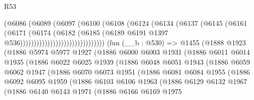 \begin{lexlean}{R53}
\begin{coremodule}
                                    (@6086
                                      (@6089
                                        (@6097
                                          (@6100
                                            (@6108
                                              (@6124
                                                (@6134
                                                  (@6137
                                                    (@6145
                                                      (@6161
                                                        (@6171
                                                          (@6174
                                                            (@6182
                                                              (@6185
                                                                (@6189
                                                                  @6191
                                                                  @1397
                                                                  @536)))))))))))))))))))))))))))))))
    (fun (__b : @530) =>
    @1455
      (@1888
        @1923
        (@1886
          @5974
          @5977
          @1927
          (@1886
            @6000
            @6003
            @1931
            (@1886
              @6011
              @6014
              @1935
              (@1886
                @6022
                @6025
                @1939
                (@1886
                  @6048
                  @6051
                  @1943
                  (@1886
                    @6059
                    @6062
                    @1947
                    (@1886
                      @6070
                      @6073
                      @1951
                      (@1886
                        @6081
                        @6084
                        @1955
                        (@1886
                          @6092
                          @6095
                          @1959
                          (@1886
                            @6103
                            @6106
                            @1963
                            (@1886
                              @6129
                              @6132
                              @1967
                              (@1886
                                @6140
                                @6143
                                @1971
                                (@1886
                                  @6166
                                  @6169
                                  @1975

\end{coremodule}
\end{lexlean}
